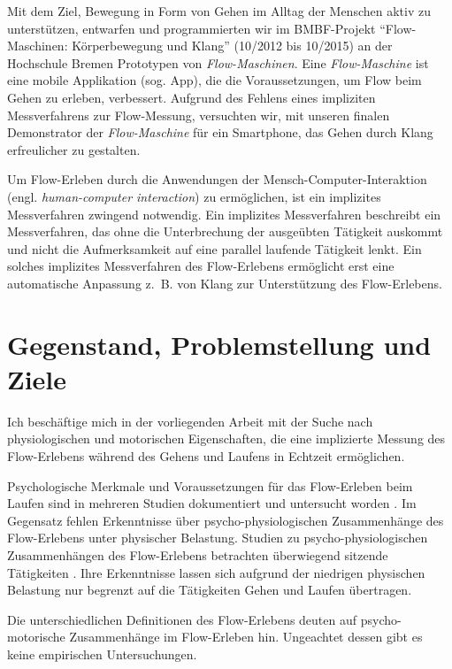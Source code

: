 Mit dem Ziel, Bewegung in Form von Gehen im Alltag der Menschen aktiv zu unterstützen, entwarfen und programmierten wir im \acs{BMBF}-Projekt "`Flow-Maschinen: Körperbewegung und Klang"' (10/2012 bis 10/2015) an der Hochschule Bremen Prototypen von \emph{Flow-Maschinen}. Eine \emph{Flow-Maschine} ist eine mobile Applikation (sog. App), die die Voraussetzungen, um Flow beim Gehen zu erleben, verbessert. Aufgrund des Fehlens eines impliziten Messverfahrens zur Flow-Messung, versuchten wir, mit unseren finalen Demonstrator der \emph{Flow-Maschine} für ein Smartphone, das Gehen durch Klang erfreulicher zu gestalten.

Um Flow-Erleben durch die Anwendungen der Mensch-Computer-Interaktion (engl. \emph{human-computer interaction}) zu ermöglichen, ist ein implizites Messverfahren zwingend notwendig. Ein implizites Messverfahren beschreibt ein Messverfahren, das ohne die Unterbrechung der ausgeübten Tätigkeit auskommt und nicht die Aufmerksamkeit auf eine parallel laufende Tätigkeit lenkt. Ein solches implizites Messverfahren des Flow-Erlebens ermöglicht erst eine automatische Anpassung z.~B. von Klang zur Unterstützung des Flow-Erlebens.

\section{Gegenstand, Problemstellung und Ziele}

Ich beschäftige mich in der vorliegenden Arbeit mit der Suche nach physiologischen und motorischen Eigenschaften, die eine implizierte Messung des Flow-Erlebens während des Gehens und Laufens in Echtzeit ermöglichen.

Psychologische Merkmale und Voraussetzungen für das Flow-Erleben beim Laufen sind in mehreren Studien dokumentiert und untersucht worden \citep{Stoll2005, Reinhardt2006, Schuler2009, Jimenez-Torres2013}. Im Gegensatz fehlen Erkenntnisse über psycho-physiologischen Zusammenhänge des Flow-Erlebens unter physischer Belastung. Studien zu psycho-physiologischen Zusammenhängen des Flow-Erlebens betrachten überwiegend sitzende Tätigkeiten \citep{deManzano2010, Keller2011, Peifer2014, Tozman2015}. Ihre Erkenntnisse lassen sich aufgrund der niedrigen physischen Belastung nur begrenzt auf die Tätigkeiten Gehen und Laufen übertragen.

Die unterschiedlichen Definitionen des Flow-Erlebens deuten auf psycho-motorische Zusammenhänge im Flow-Erleben hin. Ungeachtet dessen gibt es keine empirischen Untersuchungen.

